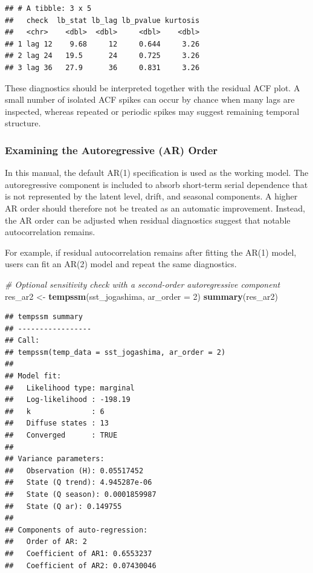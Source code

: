 \documentclass[
]{article}
\newenvironment{Shaded}{\begin{snugshade}}{\end{snugshade}}
\newcommand{\AttributeTok}[1]{\textcolor[rgb]{0.13,0.29,0.53}{#1}}
\newcommand{\CommentTok}[1]{\textcolor[rgb]{0.56,0.35,0.01}{\textit{#1}}}
\newcommand{\DecValTok}[1]{\textcolor[rgb]{0.00,0.00,0.81}{#1}}
\newcommand{\FunctionTok}[1]{\textcolor[rgb]{0.13,0.29,0.53}{\textbf{#1}}}
\newcommand{\NormalTok}[1]{#1}
\newcommand{\OtherTok}[1]{\textcolor[rgb]{0.56,0.35,0.01}{#1}}
\begin{document}
\begin{verbatim}
## # A tibble: 3 x 5
##   check  lb_stat lb_lag lb_pvalue kurtosis
##   <chr>    <dbl>  <dbl>     <dbl>    <dbl>
## 1 lag 12    9.68     12     0.644     3.26
## 2 lag 24   19.5      24     0.725     3.26
## 3 lag 36   27.9      36     0.831     3.26
\end{verbatim}

These diagnostics should be interpreted together with the residual ACF
plot. A small number of isolated ACF spikes can occur by chance when
many lags are inspected, whereas repeated or periodic spikes may suggest
remaining temporal structure.

\subsubsection{Examining the Autoregressive (AR)
Order}\label{examining-the-autoregressive-ar-order}

In this manual, the default AR(1) specification is used as the working
model. The autoregressive component is included to absorb short-term
serial dependence that is not represented by the latent level, drift,
and seasonal components. A higher AR order should therefore not be
treated as an automatic improvement. Instead, the AR order can be
adjusted when residual diagnostics suggest that notable autocorrelation
remains.

For example, if residual autocorrelation remains after fitting the AR(1)
model, users can fit an AR(2) model and repeat the same diagnostics.

\begin{Shaded}
\begin{Highlighting}[]
\CommentTok{\# Optional sensitivity check with a second{-}order autoregressive component}
\NormalTok{res\_ar2 }\OtherTok{\textless{}{-}} \FunctionTok{tempssm}\NormalTok{(sst\_jogashima, }\AttributeTok{ar\_order =} \DecValTok{2}\NormalTok{)}
\FunctionTok{summary}\NormalTok{(res\_ar2)}
\end{Highlighting}
\end{Shaded}

\begin{verbatim}
## tempssm summary
## -----------------
## Call:
## tempssm(temp_data = sst_jogashima, ar_order = 2)
## 
## Model fit:
##   Likelihood type: marginal 
##   Log-likelihood : -198.19 
##   k              : 6 
##   Diffuse states : 13 
##   Converged      : TRUE 
## 
## Variance parameters:
##   Observation (H): 0.05517452 
##   State (Q trend): 4.945287e-06 
##   State (Q season): 0.0001859987 
##   State (Q ar): 0.149755 
## 
## Components of auto-regression:
##   Order of AR: 2 
##   Coefficient of AR1: 0.6553237 
##   Coefficient of AR2: 0.07430046
\end{verbatim}
\end{document}

